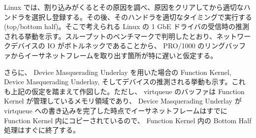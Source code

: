 \documentclass[a4paper,11pt,report]{ltjsbook}
\begin{document}
Linux では、割り込みがくるとその原因を調べ、原因をクリアしてから適切なハンドラを選択し登録する。その後、そのハンドラを適切なタイミングで実行する(top/bottom half)。そこで考えられる Linux の 1 GbE ドライバの受信時の推測される挙動を示す。スループットのベンチマークで判明したとおり、ネットワークデバイスの IO がボトルネックであることから、 PRO/1000 のリングバッファからイーサネットフレームを取り出す箇所が特に遅いと仮定する。

さらに、 Device Masquerading Underlay を用いた場合の Function Kernel, Device Masquerading Underlay, そしてデバイスの推測される挙動も示す。これも上記の仮定を踏まえて作図した。ただし、 virtqueue のバッファは Function Kernel が管理しているメモリ領域であり、 Device Masquerading Underlay が virtqueue への書き込みを完了した時点でイーサネットフレームはすでに Function Kernel 内にコピーされているので、 Function Kernel 内の Bottom Half 処理はすぐに終了する。
\end{document}
